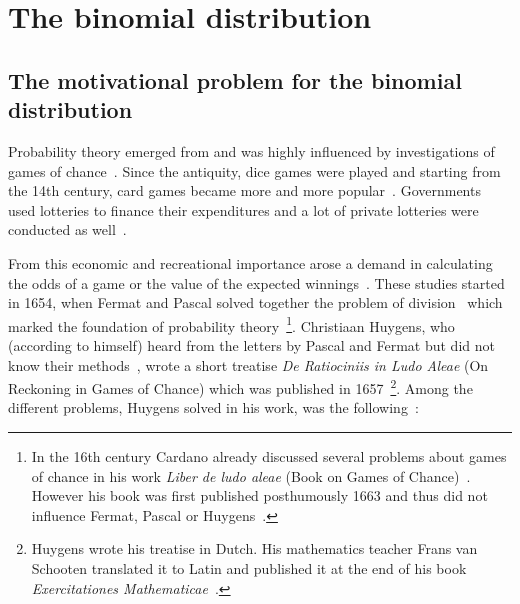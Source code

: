 \chapter{The binomial distribution}

\section{The motivational problem for the binomial distribution}


Probability theory emerged from and was highly influenced by investigations of games of chance~\cite[p. 4]{hald1}. Since the antiquity, dice games were played and starting from the 14th century, card games became more and more popular~\cite[pp. 33-34]{hald1}. Governments used lotteries to finance their expenditures and a lot of private lotteries were conducted as well~\cite[p. 34]{hald1}.

From this economic and recreational importance arose a demand in calculating the odds of a game or the value of the expected winnings~\cite[p. 34]{hald1}. These studies started in 1654, when Fermat and Pascal solved together the problem of division~\cite[pp. 42-64]{hald1} which marked the foundation of probability theory~\cite[p. 4]{hald1}\footnote{In the 16th century Cardano already discussed several problems about games of chance in his work \emph{Liber de ludo aleae} (Book on Games of Chance)~\cite[pp. 33-41]{hald1}. However his book was first published posthumously 1663 and thus did not influence Fermat, Pascal or Huygens~\cite[p. vii]{bernoulli}.}. Christiaan Huygens, who (according to himself) heard from the letters by Pascal and Fermat but did not know their methods~\cite[p. 67]{hald1}, wrote a short treatise \emph{De Ratiociniis in Ludo Aleae} (On Reckoning in Games of Chance) which was published in 1657~\cite[p. vii]{bernoulli}\footnote{Huygens wrote his treatise in Dutch. His mathematics teacher Frans van Schooten translated it to Latin and published it at the end of his book \emph{Exercitationes Mathematicae}~\cite[pp. 65-68]{hald1}.}. Among the different problems, Huygens solved in his work, was the following~\cite[p. 163]{bernoulli}:

